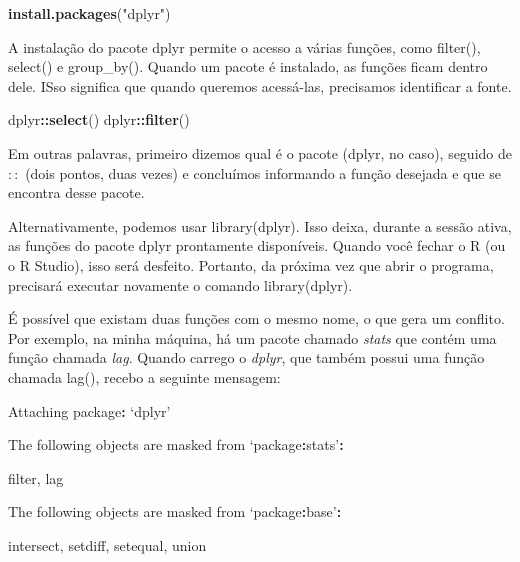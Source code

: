 \documentclass[
]{book}
\newenvironment{Shaded}{\begin{snugshade}}{\end{snugshade}}
\newcommand{\KeywordTok}[1]{\textcolor[rgb]{0.13,0.29,0.53}{\textbf{#1}}}
\newcommand{\NormalTok}[1]{#1}
\newcommand{\OperatorTok}[1]{\textcolor[rgb]{0.81,0.36,0.00}{\textbf{#1}}}
\newcommand{\StringTok}[1]{\textcolor[rgb]{0.31,0.60,0.02}{#1}}
\begin{document}
\begin{Shaded}
\begin{Highlighting}[]
\KeywordTok{install.packages}\NormalTok{(}\StringTok{"dplyr"}\NormalTok{)}
\end{Highlighting}
\end{Shaded}

A instalação do pacote dplyr permite o acesso a várias funções, como filter(), select() e group\_by(). Quando um pacote é instalado, as funções ficam dentro dele. ISso significa que quando queremos acessá-las, precisamos identificar a fonte.

\begin{Shaded}
\begin{Highlighting}[]
\NormalTok{dplyr}\OperatorTok{::}\KeywordTok{select}\NormalTok{()}
\NormalTok{dplyr}\OperatorTok{::}\KeywordTok{filter}\NormalTok{()}
\end{Highlighting}
\end{Shaded}

Em outras palavras, primeiro dizemos qual é o pacote (dplyr, no caso), seguido de \(::\) (dois pontos, duas vezes) e concluímos informando a função desejada e que se encontra desse pacote.

Alternativamente, podemos usar library(dplyr). Isso deixa, durante a sessão ativa, as funções do pacote dplyr prontamente disponíveis. Quando você fechar o R (ou o R Studio), isso será desfeito. Portanto, da próxima vez que abrir o programa, precisará executar novamente o comando library(dplyr).

É possível que existam duas funções com o mesmo nome, o que gera um conflito. Por exemplo, na minha máquina, há um pacote chamado \emph{stats} que contém uma função chamada \emph{lag}. Quando carrego o \emph{dplyr}, que também possui uma função chamada lag(), recebo a seguinte mensagem:

\begin{Shaded}
\begin{Highlighting}[]
\NormalTok{Attaching package}\OperatorTok{:}\StringTok{ }\NormalTok{‘dplyr’}

\NormalTok{The following objects are masked from ‘package}\OperatorTok{:}\NormalTok{stats’}\OperatorTok{:}

\StringTok{    }\NormalTok{filter, lag}

\NormalTok{The following objects are masked from ‘package}\OperatorTok{:}\NormalTok{base’}\OperatorTok{:}

\StringTok{    }\NormalTok{intersect, setdiff, setequal, union}
\end{Highlighting}
\end{Shaded}
\end{document}
